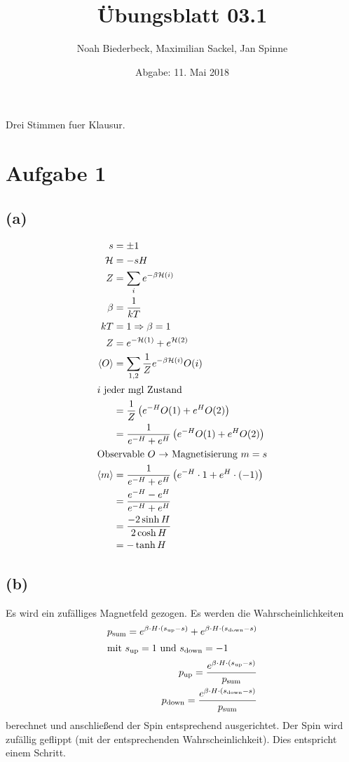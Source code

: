 \documentclass{scrartcl}
\title{Übungsblatt 03.1}
\author{%
  Noah Biederbeck, Maximilian Sackel, Jan Spinne
}
\date{Abgabe: 11. Mai 2018}
\begin{document}
\maketitle

Drei Stimmen fuer Klausur.

\section*{Aufgabe 1}
\subsection*{(a)}
\begin{align*}
  s &= \pm 1 \\
  \mathcal{H} &= -sH \\
  Z &= \sum_i e^{-\beta \mathcal{H}(i)} \\
  \beta &= \frac{1}{kT} \\
  kT &= 1 \Rightarrow \beta = 1 \\
  Z &= e^{-\mathcal{H}(1)} + e^{\mathcal{H}(2)} \\
  \left<O\right> &= \sum_{1, 2} \frac{1}{Z} e^{-\beta \mathcal{H} (i)} O(i) \\
  \intertext{$i$ jeder mgl Zustand}
                 &= \frac{1}{Z} \left( e^{-H} O(1) + e^H  O(2) \right)\\
                 &= \frac{1}{e^{-H} + e^H} \left( e^{-H} O(1) + e^H  O(2) \right) \\
  \intertext{Observable $O$ $\rightarrow$ Magnetisierung $m = s$}
  \left<m\right> &= \frac{1}{e^{-H} + e^H} \left( e^{-H} \cdot 1 + e^H \cdot (-1) \right)\\
                 &= \frac{e^{-H} - e^H}{e^{-H} + e^H} \\
                 &= \frac{-2 \sinh{H}}{2 \cosh{H}} \\
                 &= -\tanh{H}
\end{align*}

\subsection*{(b)}
Es wird ein zufälliges Magnetfeld gezogen.
Es werden die Wahrscheinlichkeiten
\begin{align*}
  p_{\text{sum}} = e^{\beta \cdot H \cdot (s_{\text{up}} - s)} + e^{\beta \cdot H \cdot (s_{\text{down}} - s)} \\
  \intertext{mit $s_{\text{up}} = 1$ und $s_{\text{down}} = -1$}
  p_{\text{up}} = \frac{e^{\beta \cdot H \cdot (s_{\text{up}} - s)}}{p_{\text{sum}}} \\
  p_{\text{down}} = \frac{e^{\beta \cdot H \cdot (s_{\text{down}} - s)}}{p_{\text{sum}}} \\
\end{align*}
berechnet und anschließend der Spin entsprechend ausgerichtet.
Der Spin wird zufällig geflippt (mit der entsprechenden Wahrscheinlichkeit).
Dies entspricht einem Schritt.
\end{document}
